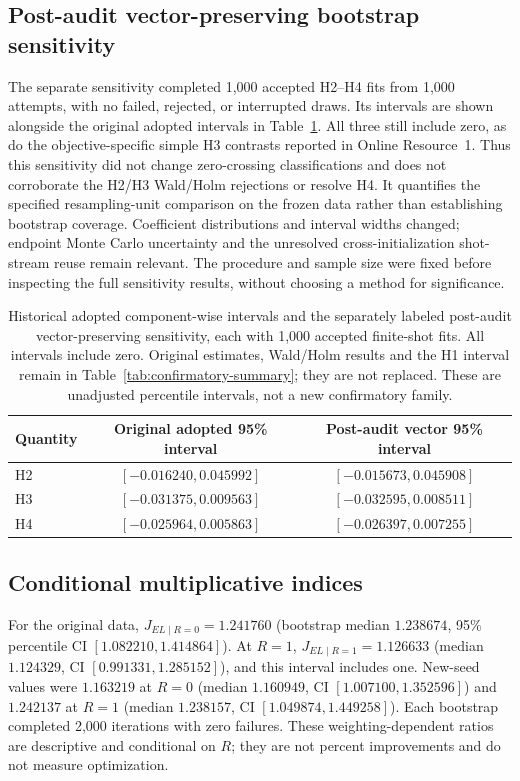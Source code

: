 \documentclass[pdflatex,sn-mathphys-num,Numbered]{sn-jnl}
\begin{document}
\subsection{Post-audit vector-preserving bootstrap sensitivity}\label{sec:vector-bootstrap-results}
The separate sensitivity completed 1,000 accepted H2--H4 fits from 1,000 attempts, with no failed, rejected, or interrupted draws. Its intervals are shown alongside the original adopted intervals in Table~\ref{tab:vector-bootstrap}. All three still include zero, as do the objective-specific simple H3 contrasts reported in Online Resource~1. Thus this sensitivity did not change zero-crossing classifications and does not corroborate the H2/H3 Wald/Holm rejections or resolve H4. It quantifies the specified resampling-unit comparison on the frozen data rather than establishing bootstrap coverage. Coefficient distributions and interval widths changed; endpoint Monte Carlo uncertainty and the unresolved cross-initialization shot-stream reuse remain relevant. The procedure and sample size were fixed before inspecting the full sensitivity results, without choosing a method for significance.
\begin{table}[t]\centering\small
\begin{tabular}{lcc}
\toprule
Quantity & Original adopted 95\% interval & Post-audit vector 95\% interval \\
\midrule
H2 & $[-0.016240,0.045992]$ & $[-0.015673,0.045908]$ \\
H3 & $[-0.031375,0.009563]$ & $[-0.032595,0.008511]$ \\
H4 & $[-0.025964,0.005863]$ & $[-0.026397,0.007255]$ \\
\bottomrule
\end{tabular}
\caption{Historical adopted component-wise intervals and the separately labeled post-audit vector-preserving sensitivity, each with 1,000 accepted finite-shot fits. All intervals include zero. Original estimates, Wald/Holm results and the H1 interval remain in Table~\ref{tab:confirmatory-summary}; they are not replaced. These are unadjusted percentile intervals, not a new confirmatory family.}
\label{tab:vector-bootstrap}
\end{table}

\subsection{Conditional multiplicative indices}

For the original data, $J_{EL\mid R=0}=1.241760$ (bootstrap median $1.238674$, 95\% percentile CI $[1.082210,1.414864]$). At $R=1$, $J_{EL\mid R=1}=1.126633$ (median $1.124329$, CI $[0.991331,1.285152]$), and this interval includes one. New-seed values were $1.163219$ at $R=0$ (median $1.160949$, CI $[1.007100,1.352596]$) and $1.242137$ at $R=1$ (median $1.238157$, CI $[1.049874,1.449258]$). Each bootstrap completed 2,000 iterations with zero failures. These weighting-dependent ratios are descriptive and conditional on $R$; they are not percent improvements and do not measure optimization.
\end{document}
